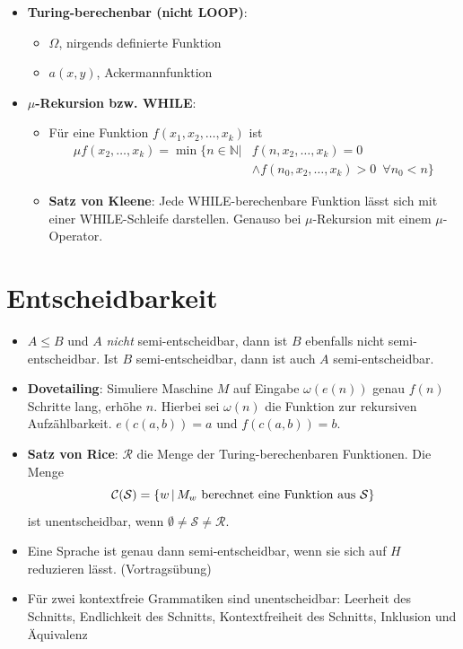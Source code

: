 \documentclass[landscape, 8pt, a4paper]{extarticle}
\newcommand{\N}{\mathbb{N}}
\newcommand{\set}[2]{\ensuremath\left\{ #1 \,\middle|\, #2 \right\}}
\begin{document}
\begin{multicols}{3}
\begin{itemize}
		\item \textbf{Turing-berechenbar (nicht LOOP)}:
		\begin{itemize}
			\item $\Omega$, nirgends definierte Funktion
			\item $a(x,y)$, Ackermannfunktion
		\end{itemize}

		\item \textbf{$\mu$-Rekursion bzw. WHILE}:
		\begin{itemize}
			\item Für eine Funktion $f(x_1,x_2,\ldots,x_k)$ ist
			\begin{align*}
				\mu f(x_2,\ldots,x_k)=\min\{n\in\N | &f(n,x_2,\ldots,x_k)=0\\&\wedge f(n_0,x_2,\ldots,x_k)>0 \enspace\forall n_0<n\}
			\end{align*}
			\item \textbf{Satz von Kleene}: Jede WHILE-berechenbare Funktion lässt sich mit einer WHILE-Schleife darstellen. Genauso bei $\mu$-Rekursion mit einem $\mu$-Operator.
		\end{itemize}
	\end{itemize}

	\section{Entscheidbarkeit}
	\begin{itemize}
		\item $A\leq B$ und $A$ \textit{nicht} semi-entscheidbar, dann ist $B$ ebenfalls nicht semi-entscheidbar.
		Ist $B$ semi-entscheidbar, dann ist auch $A$ semi-entscheidbar.
		\item \textbf{Dovetailing}:
		Simuliere Maschine $M$ auf Eingabe $\omega(e(n))$ genau $f(n)$ Schritte lang, erhöhe $n$. Hierbei sei $\omega(n)$ die Funktion zur rekursiven Aufzählbarkeit. $e(c(a,b))=a$ und $f(c(a,b))=b$.
		\item \textbf{Satz von Rice}: $\mathcal R$ die Menge der Turing-berechenbaren Funktionen. Die Menge
		\begin{equation*}
			\mathcal C(\mathcal S)=\set{w}{M_w\text{ berechnet eine Funktion aus } \mathcal S}
		\end{equation*}
		ist unentscheidbar, wenn $\emptyset\neq\mathcal S\neq\mathcal R$.
		\item Eine Sprache ist genau dann semi-entscheidbar, wenn sie sich auf $H$ reduzieren lässt. (Vortragsübung)
		\item Für zwei kontextfreie Grammatiken sind unentscheidbar: Leerheit des Schnitts, Endlichkeit des Schnitts, Kontextfreiheit des Schnitts, Inklusion und Äquivalenz


\end{itemize}
\end{multicols}
\end{document}
